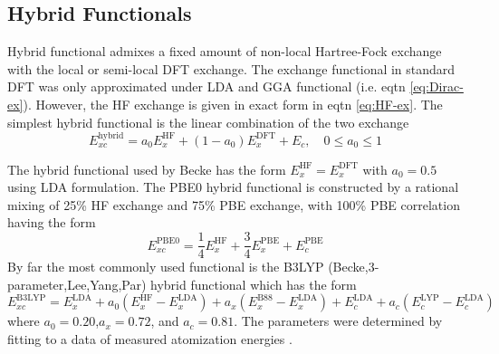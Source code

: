 \subsection{Hybrid Functionals}
Hybrid functional admixes a fixed amount of  non-local Hartree-Fock exchange with the local or semi-local DFT exchange. The exchange functional in standard DFT was only approximated under LDA and GGA functional (i.e. eqtn  \eqref{eq:Dirac-ex}). However, the HF exchange is given in exact form in eqtn  \eqref{eq:HF-ex}. The simplest hybrid functional is the linear combination of the two exchange
\begin{equation}
	E_{xc}^{\text{hybrid}} = a_0 E_x^{\text{HF}} + (1 - a_0) E_x^{\text{DFT}} + E_c, \quad 0 \leq a_0 \leq 1
\end{equation}

The hybrid functional used by Becke \citep{Becke1993} has the form $E_x^{\text{HF}} = E_x^{\text{DFT}}$ with $a_0 = 0.5$ using LDA formulation. The PBE0 \citep{Perdew1996a,Adamo1999} hybrid functional is constructed by a rational mixing of 25\% HF exchange and 75\% PBE exchange, with 100\% PBE correlation having the form
\begin{equation}
	E_{xc}^{\text{PBE0}} = \frac{1}{4} E_x^{\text{HF}} + \frac{3}{4} E_x^{\text{PBE}} + E_c^{\text{PBE}}
\end{equation}
By far the most commonly used functional is the B3LYP (Becke,3-parameter,Lee,Yang,Par) \citep{Becke1988,Lee1988} hybrid functional which has the form  \citep{Paier2007}
\begin{equation}
	E_{xc}^{\text{B3LYP}} = E_x^{\text{LDA}} + a_0 (E_x^{\text{HF}} - E_x^{\text{LDA}} ) + a_x (E_x^{\text{B88}} - E_x^{\text{LDA}} ) + E_c^{\text{LDA}} + a_c (E_c^{\text{LYP}} - E_c^{\text{LDA}})
\end{equation}
where $a_0=0.20$,$a_x=0.72$, and $a_c=0.81$. The parameters were
determined by fitting to a data of measured atomization
energies \citep{Perdew1996a}.

